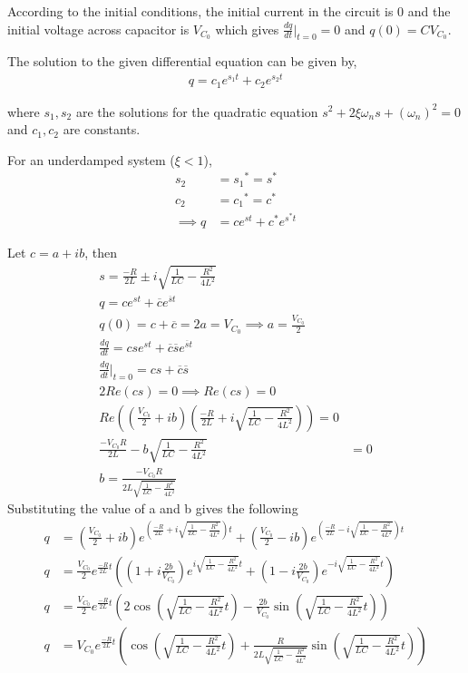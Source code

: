 \documentclass[12pt]{article}
\providecommand{\brak}[1]{\ensuremath{\left(#1\right)}}
\begin{document}
According to the initial conditions, the initial current in the circuit is 0 and the initial voltage across capacitor is $V_{C_0}$ which gives $\frac{dq}{dt}\Bigr|_{t=0} = 0 $ and $q(0) = CV_{C_0}$.

The solution to the given differential equation can be given by,
\begin{align*}
    q = c_1e^{s_1 t} + {c_2} e^{s_2 t}
\end{align*}

where $s_1, s_2$ are the solutions for the quadratic equation $s^2 + 2\xi\omega_{n}s + \brak{\omega_{n}}^2 = 0$ and $c_1, c_2$ are constants.

For an underdamped system ($\xi < 1$),
\begin{align}
    s_2 &= {s_1}^{\ast} = s^{\ast}\\
    c_2 &= {c_1}^{\ast} = c^{\ast}\\
    \implies q &= ce^{st} + c^{\ast}e^{s^{\ast}t}
\end{align}

Let $c = a+ib$, then
\begin{align*}
    s = \frac{-R}{2L} \pm i \sqrt{\frac{1}{LC} - \frac{R^2}{4L^2}}\\
    q = c e^{st} + \overline{c} e^{\overline{s}t}\\
    q(0) = c + \overline{c} = 2 a = V_{C_0} \implies a = \frac{V_{C_0}}{2}\\
    \frac{dq}{dt} = cs e^{st} + \overline{c} \overline{s} e^{\overline{s}t}\\
    \frac{dq}{dt}\Bigr|_{t=0} = cs + \overline{c} \overline{s}\\
    2 Re(cs) = 0 \implies Re(cs) = 0 \\
    Re((\frac{V_{C_0}}{2} + ib) ( \frac{-R}{2L} + i \sqrt{\frac{1}{LC} - \frac{R^2}{4L^2}} )) = 0\\
    \frac{-V_{C_0} R}{2L} - b \sqrt{\frac{1}{LC} - \frac{R^2}{4L^2}} &= 0\\
    b = \frac{-V_{C_0} R}{2L \sqrt{\frac{1}{LC} - \frac{R^2}{4L^2}}}
\end{align*}
Substituting the value of a and b gives the following
\begin{align*}
    q &= \brak{ \frac{V_{C_0}}{2} + i b } e^{\brak{ \frac{-R}{2L} + i \sqrt{\frac{1}{LC} - \frac{R^2}{4L^2}} } t} + \brak{ \frac{V_{C_0}}{2} - i b } e^{\brak{ \frac{-R}{2L} - i \sqrt{\frac{1}{LC} - \frac{R^2}{4L^2}} } t} \\
    q &= \frac{V_{C_0}}{2} e^{\frac{-R}{2L}t} \brak{ \brak{ 1 + i \frac{2b}{V_{C_0}} } e^{i \sqrt{\frac{1}{LC} - \frac{R^2}{4L^2}} t} + \brak{ 1 - i \frac{2b}{V_{C_0}} } e^{-i \sqrt{\frac{1}{LC} - \frac{R^2}{4L^2}} t} } \\
    q &= \frac{V_{C_0}}{2} e^{\frac{-R}{2L}t} \brak{ 2 \cos \brak{ \sqrt{\frac{1}{LC} - \frac{R^2}{4L^2}} t } - \frac{2 b}{V_{C_0}} \sin \brak{ \sqrt{\frac{1}{LC} - \frac{R^2}{4L^2}} t } } \\
    q &= V_{C_0} e^{\frac{-R}{2L}t} \brak{ \cos \brak{ \sqrt{\frac{1}{LC} - \frac{R^2}{4L^2}} t } + \frac{R}{2L\sqrt{\frac{1}{LC} - \frac{R^2}{4L^2}}} \sin \brak{\sqrt{\frac{1}{LC} - \frac{R^2}{4L^2}} t } }
\end{align*}
\end{document}
